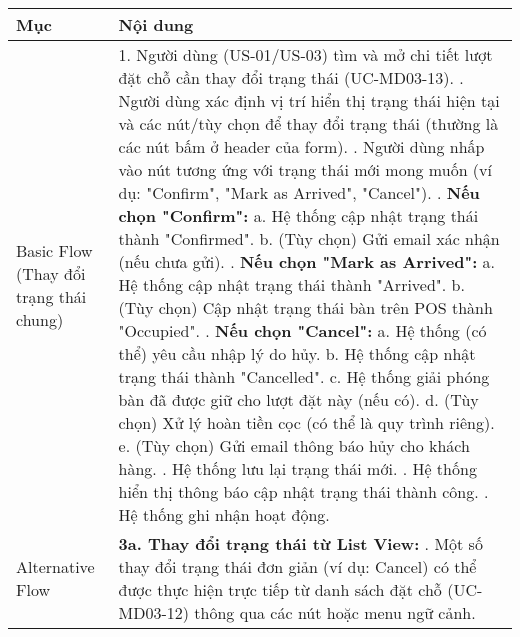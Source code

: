 \begin{longtable}{|m{4cm}|p{11cm}|}
\hline
\textbf{Mục} & \textbf{Nội dung} \\
\hline
Basic Flow (Thay đổi trạng thái chung) & 1. Người dùng (US-01/US-03) tìm và mở chi tiết lượt đặt chỗ cần thay đổi trạng thái (UC-MD03-13). \newline 2. Người dùng xác định vị trí hiển thị trạng thái hiện tại và các nút/tùy chọn để thay đổi trạng thái (thường là các nút bấm ở header của form). \newline 3. Người dùng nhấp vào nút tương ứng với trạng thái mới mong muốn (ví dụ: "Confirm", "Mark as Arrived", "Cancel"). \newline 4. \textbf{Nếu chọn "Confirm":} \newline    a. Hệ thống cập nhật trạng thái thành "Confirmed". \newline    b. (Tùy chọn) Gửi email xác nhận (nếu chưa gửi). \newline 5. \textbf{Nếu chọn "Mark as Arrived":} \newline    a. Hệ thống cập nhật trạng thái thành "Arrived". \newline    b. (Tùy chọn) Cập nhật trạng thái bàn trên POS thành "Occupied". \newline 6. \textbf{Nếu chọn "Cancel":} \newline    a. Hệ thống (có thể) yêu cầu nhập lý do hủy. \newline    b. Hệ thống cập nhật trạng thái thành "Cancelled". \newline    c. Hệ thống giải phóng bàn đã được giữ cho lượt đặt này (nếu có). \newline    d. (Tùy chọn) Xử lý hoàn tiền cọc (có thể là quy trình riêng). \newline    e. (Tùy chọn) Gửi email thông báo hủy cho khách hàng. \newline 7. Hệ thống lưu lại trạng thái mới. \newline 8. Hệ thống hiển thị thông báo cập nhật trạng thái thành công. \newline 9. Hệ thống ghi nhận hoạt động. \\
\hline
Alternative Flow & \textbf{3a. Thay đổi trạng thái từ List View:} \newline    1. Một số thay đổi trạng thái đơn giản (ví dụ: Cancel) có thể được thực hiện trực tiếp từ danh sách đặt chỗ (UC-MD03-12) thông qua các nút hoặc menu ngữ cảnh. \\
\hline

\end{longtable}
